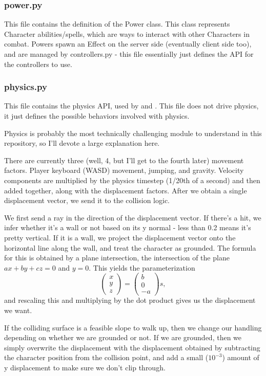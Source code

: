 \documentclass{article}
\begin{document}
\subsubsection{power.py}
This file contains the definition of the Power class. This class represents Character
abilities/spells, which are ways to interact with other Characters in combat.
Powers spawn an Effect on the server side (eventually client side too), and are
managed by controllers.py - this file essentially just defines the API for the
controllers to use.
\subsubsection{physics.py}
This file contains the physics API, used by  and
. This file does not drive physics, it just defines the possible
behaviors involved with physics.

Physics is probably the most technically challenging module to understand in this
repository, so I'll devote a large explanation here.

There are currently three (well, 4, but I'll get to the fourth later) movement
factors. Player keyboard (WASD) movement, jumping, and gravity. Velocity
components are multiplied by the physics timestep (1/20th of a second) and then
added together, along with the displacement factors. After we obtain a single
displacement vector, we send it to the collision logic.

We first send a ray in the direction of the displacement vector.
If there's a hit, we infer whether it's a wall or not based on its y normal -
less than 0.2 means it's pretty vertical. If it is a wall, we project the
displacement vector onto the horizontal line along the wall, and treat the character
as grounded.
The formula for this is obtained by a plane intersection, the intersection of the
plane $ax + by + cz = 0$ and $y = 0$. This yields the parameterization
\[
\begin{pmatrix}
    x\\
    y\\
    z 
\end{pmatrix} =
\begin{pmatrix}
    b\\0\\-a
\end{pmatrix}s,\]
and rescaling this and multiplying by the dot product gives us the displacement
we want.

If the colliding surface is a feasible slope to walk up, then we change
our handling depending on whether we are grounded or not. If we are grounded,
then we simply overwrite the displacement with the displacement obtained
by subtracting the character position from the collision point, and
add a small ($10^{-3}$) amount of y displacement to make sure we don't
clip through.
\end{document}
